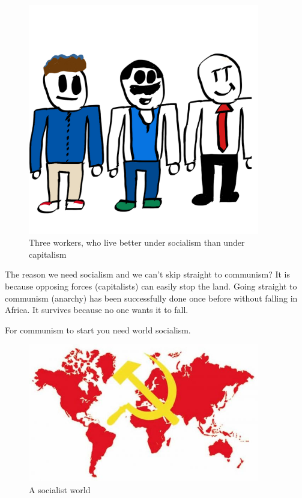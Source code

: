 \documentclass[a4paper]{book}%
\begin{document}
\begin{figure}[tbhp]
\centering
\includegraphics[width=0.9\textwidth]{3-2.png}
\caption{Three workers, who live better under socialism than under capitalism}
\end{figure}

The reason we need socialism and we can't skip straight to communism? It is because opposing forces (capitalists) can easily stop the land. Going straight to communism (anarchy) has been successfully done once before without falling in Africa. It survives because no one wants it to fall.

For communism to start you need world socialism.

\begin{figure}[tbhp]
\centering
\includegraphics[width=0.9\textwidth]{3-3.jpg}
\caption{A socialist world}
\end{figure}
\end{document}

